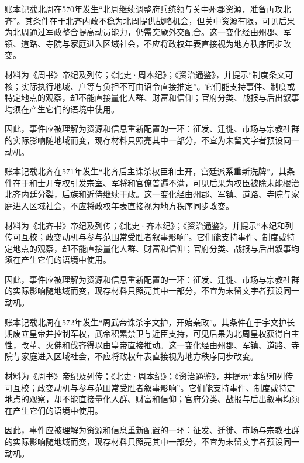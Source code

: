 账本记载北周在570年发生“北周继续调整府兵统领与关中州郡资源，准备再攻北齐”。其条件在于北齐内政不稳为北周提供战略机会，但关中资源有限，可见后果为北周通过军政整合提高动员能力，仍需突厥外交配合。这一变化经由州郡、军镇、道路、寺院与家庭进入区域社会，不应将政权年表直接视为地方秩序同步改变。

材料为《周书》帝纪及列传；《北史·周本纪》；《资治通鉴》，并提示“制度条文可核；实际执行地域、户等与负担不可由诏令直接推定”。它们能支持事件、制度或特定地点的观察，却不能直接量化人群、财富和信仰；官府分类、战报与后出叙事均须在产生它们的语境中使用。

因此，事件应被理解为资源和信息重新配置的一环：征发、迁徙、市场与宗教社群的实际影响随地域而变，现存材料只照亮其中一部分，不宜为未留文字者预设同一动机。

账本记载北齐在571年发生“北齐后主诛杀权臣和士开，宫廷派系重新洗牌”。其条件在于和士开专权引发宗室、军将和官僚普遍不满，可见后果为权臣被除未能根治北齐内廷分裂，后族和近侍继续干政。这一变化经由州郡、军镇、道路、寺院与家庭进入区域社会，不应将政权年表直接视为地方秩序同步改变。

材料为《北齐书》帝纪及列传；《北史·齐本纪》；《资治通鉴》，并提示“本纪和列传可互校；政变动机与参与范围常受胜者叙事影响”。它们能支持事件、制度或特定地点的观察，却不能直接量化人群、财富和信仰；官府分类、战报与后出叙事均须在产生它们的语境中使用。

因此，事件应被理解为资源和信息重新配置的一环：征发、迁徙、市场与宗教社群的实际影响随地域而变，现存材料只照亮其中一部分，不宜为未留文字者预设同一动机。

账本记载北周在572年发生“周武帝诛杀宇文护，开始亲政”。其条件在于宇文护长期废立皇帝并控制军权，武帝积累禁卫与近臣支持，可见后果为北周皇权获得自主性，改革、灭佛和伐齐得以由皇帝直接推动。这一变化经由州郡、军镇、道路、寺院与家庭进入区域社会，不应将政权年表直接视为地方秩序同步改变。

材料为《周书》帝纪及列传；《北史·周本纪》；《资治通鉴》，并提示“本纪和列传可互校；政变动机与参与范围常受胜者叙事影响”。它们能支持事件、制度或特定地点的观察，却不能直接量化人群、财富和信仰；官府分类、战报与后出叙事均须在产生它们的语境中使用。

因此，事件应被理解为资源和信息重新配置的一环：征发、迁徙、市场与宗教社群的实际影响随地域而变，现存材料只照亮其中一部分，不宜为未留文字者预设同一动机。

